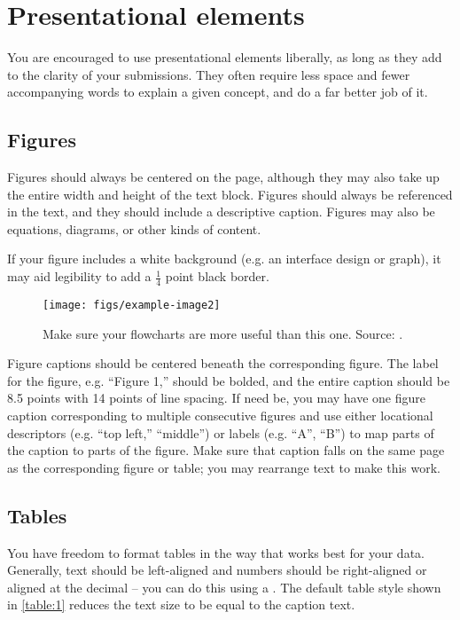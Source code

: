 \section{Presentational elements}
You are encouraged to use presentational elements liberally, as long as they add to the clarity of your submissions. They often require less space and fewer accompanying words to explain a given concept, and do a far better job of it.

\subsection{Figures}
Figures should always be centered on the page, although they may also take up the entire width and height of the text block. Figures should always be referenced in the text, and they should include a descriptive caption. Figures may also be equations, diagrams, or other kinds of content.

If your figure includes a white background (e.g. an interface design or graph), it may aid legibility to add a $\frac{1}{4}$ point black border.

\begin{figure}[H]
  \centering
  \texttt{[image: figs/example-image2]}
  \caption{Make sure your flowcharts are more useful than this one. Source: .}
  \label{fig::2}
\end{figure}

Figure captions should be centered beneath the corresponding figure. The label for the figure, e.g. “Figure 1,” should be bolded, and the entire caption should be 8.5 points with 14 points of line spacing. If need be, you may have one figure caption corresponding to multiple consecutive figures and use either locational descriptors (e.g. “top left,” “middle”) or labels (e.g. “A”, “B”) to map parts of the caption to parts of the figure. Make sure that caption falls on the same page as the corresponding figure or table; you may rearrange text to make this work.

\subsection{Tables}
You have freedom to format tables in the way that works best for your data. Generally, text should be left-aligned and numbers should be right-aligned or aligned at the decimal – you can do this using a . The default table style shown in \autoref{table:1} reduces the text size to be equal to the caption text.

